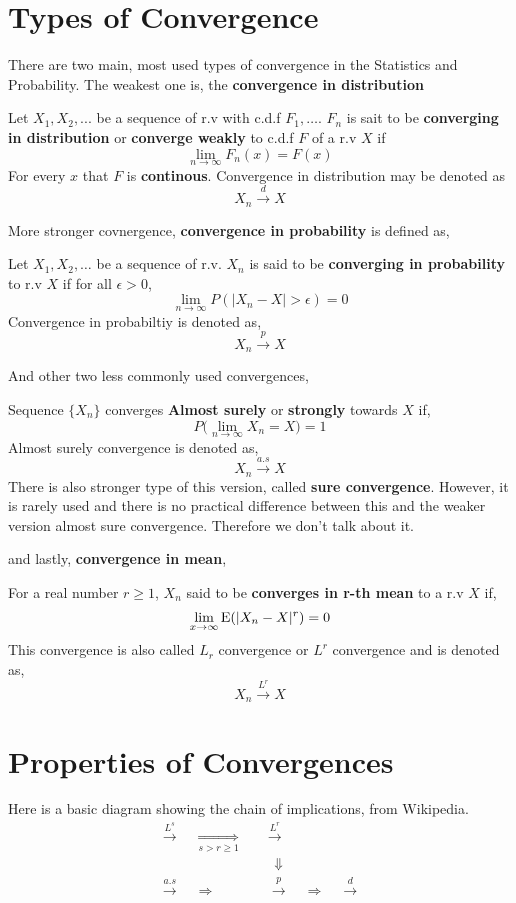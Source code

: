 \section{Types of Convergence}
There are two main, most used types of convergence in the Statistics and Probability. The weakest one is, the \textbf{convergence in distribution}
\begin{definition}
    Let $X_1,X_2, ...$ be a sequence of r.v  with c.d.f $F_1, \ldots $. $F_n$ is sait to be \textbf{converging in distribution} or \textbf{converge weakly} to c.d.f $F$ of a r.v $X$ if
    \[ \lim_{n \rightarrow \infty} F_n(x) = F(x)\]
    For every $x$ that  $F$ is \textbf{continous}. Convergence in distribution may be denoted as 
    \[ X_n \stackrel{d}{\rightarrow} X \]
\end{definition}
More stronger covnergence, \textbf{convergence in probability} is defined as,
\begin{definition}
    Let $X_1,X_2, \ldots $ be a sequence of r.v. $X_n$ is said to be \textbf{converging in probability} to r.v $X$ if for all $\epsilon > 0$,
    \[ \lim_{n \rightarrow \infty} P(|X_n - X| > \epsilon) = 0 \]
    Convergence in probabiltiy is denoted as, 
    \[ X_n \stackrel{p}{\rightarrow} X\]
\end{definition}
And other two less commonly used convergences,
\begin{definition}
    Sequence $\{ X_n \}$  converges \textbf{Almost surely} or \textbf{strongly} towards $X$ if,
    \[ P \biggl( \lim_{n \rightarrow \infty}X_n = X \biggr) = 1\]
    Almost surely convergence is denoted as, 
    \[ X_n \stackrel{a.s}{\rightarrow} X\]
    There is also stronger type of this version, called \textbf{sure convergence}. However, it is rarely used and there is no practical difference between this and the weaker version almost sure convergence. Therefore we don't talk about it.
\end{definition}
and lastly, \textbf{convergence in mean},
\begin{definition}
    For  a real number $r \ge 1$, $X_n$ said to be \textbf{converges in r-th mean} to a r.v $X$ if, 
    \[\lim_{x \rightarrow \infty} {\operatorname{E}}(|X_n - X|^r) = 0 \]
    This convergence is also called $L_r$ convergence or $L^r$ convergence and is denoted as,
    \[ X_n  \stackrel{L^{r}}{\rightarrow} X \]
\end{definition}

\section{Properties of Convergences}
Here is a basic diagram showing the chain of implications, from Wikipedia.
\begin{align*}
    \stackrel{L^{s}}{\longrightarrow} \quad \underset{s>r\ge 1}{\Rightarrow} \quad &\stackrel{L^{r}}{\longrightarrow} \\
    & \ \  \Downarrow \\
    \stackrel{a.s}{\longrightarrow} \quad  \Rightarrow \quad &\stackrel{p}{\longrightarrow} \quad \Rightarrow \quad \stackrel{d}{\longrightarrow}
\end{align*}

